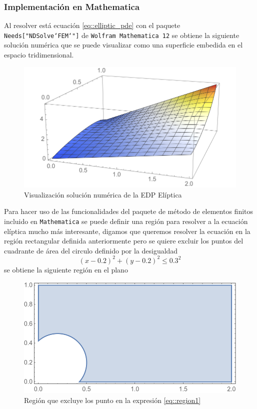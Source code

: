 \documentclass[a4paper]{article}
\begin{document}
\subsubsection{Implementación en Mathematica}
Al resolver está ecuación \ref{eq::elliptic_pde} con el paquete \texttt{Needs["NDSolve`FEM`"]} de \texttt{Wolfram Mathematica 12} se obtiene la siguiente solución numérica que se puede visualizar como una superficie embedida en el espacio tridimensional.
\begin{figure}[H]
\begin{center}
\includegraphics[scale=0.42]{./elliptic.png} 
\end{center} 
\caption{Visualización solución numérica de la EDP Elíptica}
\label{fig::fig2}
\end{figure}
Para hacer uso de las funcionalidades del paquete de método de elementos finitos incluido en \texttt{Mathematica} se puede definir una región para resolver a la ecuación elíptica mucho más interesante, digamos que queremos resolver la ecuación en la región rectangular definida anteriormente pero se quiere excluir los puntos del cuadrante de área del circulo definido por la desigualdad
\begin{equation}\label{eq::region1}
(x-0.2)^2+(y-0.2)^2\leq 0.3^2
\end{equation}
se obtiene la siguiente región en el plano
\begin{figure}[H]
\begin{center}
\includegraphics[scale=0.42]{./elliptic_omega.png} 
\end{center} 
\caption{Región que excluye los punto en la expresión \ref{eq::region1}}
\label{fig::fig3}
\end{figure}
\end{document}
